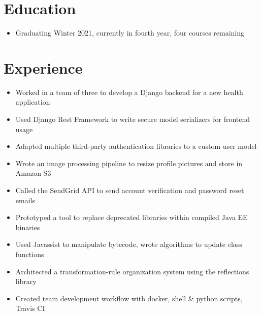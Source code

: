 \documentclass[]{rcf_cv}
\begin{document}
	
	

	\section{Education}
	
		\begin{itemize}
			\setlength\itemsep{-0.4em}
			\renewcommand\labelitemi{--}
			
			\item Graduating Winter 2021, currently in fourth year, four courses remaining
					
			
			
		\end{itemize}
	
	\section{Experience}
	
		
		\begin{itemize}
			\setlength\itemsep{-0.4em}
			\renewcommand\labelitemi{--}
		
			\item Worked in a team of three to develop a Django backend for a new health application
			\item Used Django Rest Framework to write secure model serializers for frontend usage
			\item Adapted multiple third-party authentication libraries to a custom user model
			\item Wrote an image processing pipeline to resize profile pictures and store in Amazon S3
			\item Called the SendGrid API to send account verification and password reset emails

		\end{itemize}
	
		\begin{itemize}
			\setlength\itemsep{-0.4em}
			\renewcommand\labelitemi{--}
			
			\item Prototyped a tool to replace deprecated libraries within compiled Java EE binaries
			\item Used Javassist to manipulate bytecode, wrote algorithms to update class functions
			\item Architected a transformation-rule organization system using the reflections library
			\item Created team development workflow with docker, shell \& python scripts, Travis CI

		\end{itemize}
	
\end{document}
